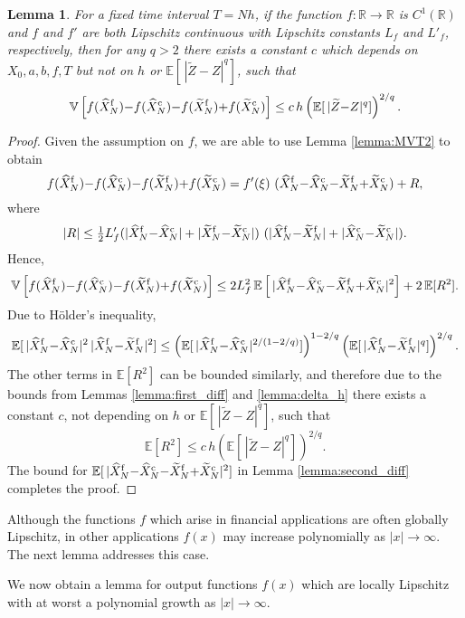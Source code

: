 \documentclass[11pt]{article}
\def \RR {{\mathbb{R}}}
\def \EE {{\mathbb{E}}}
\def \VV {{\mathbb{V}}}
\def \tZ {{\widetilde{Z}}}
\def \tXf  {{\widetilde{X}^{\rm f}}}
\def \tXc  {{\widetilde{X}^{\rm c}}}
\def \hXf {{\widehat{X}^{\rm f}}}
\def \hXc {{\widehat{X}^{\rm c}}}
\newcommand{\fracs}[2]{{\textstyle \frac{#1}{#2}}}
\newtheorem{lemma}[theorem]{Lemma}
\begin{document}
\begin{lemma}
For a fixed time interval $T\!=\!N h$, if the function $f: \RR \rightarrow \RR$
is $C^1(\RR)$ and $f$ and $f'$ are both Lipschitz continuous with Lipschitz constants 
$L_f$ and $L'_f$, respectively, then for any $q\!>\!2$ there exists a constant $c$ which 
depends on $X_0, a, b, f, T$ but not on $h$ or $\EE[\, |\tZ{-}Z|^q]$, such that
\[
\VV\left[ f(\hXf_N){-}f(\hXc_N) {-} f(\tXf_N){+}f(\tXc_N)\right] 
\leq c\, h \left(\EE[\, |\tZ{-}Z|^q]\right)^{2/q}.
\]
\end{lemma}
\begin{proof}
Given the assumption on $f$, we are able to use Lemma \ref{lemma:MVT2} to obtain
\[
f(\hXf_N){-}f(\hXc_N) {-} f(\tXf_N){+}f(\tXc_N)
= f'(\xi)\ (\hXf_N{-}\hXc_N{-}\tXf_N{+}\tXc_N)
+ R,
\]
where
\[
|R| \leq \fracs{1}{2} L'_f (|\hXf_N{-}\hXc_N| + |\tXf_N{-}\tXc_N|)\ (|\hXf_N{-}\tXf_N| + |\hXc_N{-}\tXc_N|).
\]
Hence,
\[
\VV\left[ f(\hXf_N){-}f(\hXc_N) {-} f(\tXf_N){+}f(\tXc_N)\right] 
\leq 2 L_f^2\, \EE\left[\, |\hXf_N{-}\hXc_N{-}\tXf_N{+}\tXc_N|^2\right]
 + 2\, \EE[R^2]. 
\]
Due to H\"older's inequality, 
\[
\EE[\, |\hXf_N{-}\hXc_N|^2 \, |\hXf_N{-}\tXf_N|^2]
\leq
\left( \EE[\,|\hXf_N{-}\hXc_N|^{2/(1-2/q)}] \right)^{1 - 2/q}
\left( \EE[\,|\hXf_N{-}\tXf_N|^q] \right)^{2/q}.
\]
The other terms in $\EE[R^2]$ can be bounded similarly, and therefore due to the bounds
from Lemmas \ref{lemma:first_diff} and \ref{lemma:delta_h} there exists a constant $c$,
not depending on $h$ or $\EE[\,|\tZ{-}Z|^q]$, such that
\[
\EE[R^2] \leq c\, h \left(\EE[\,|\tZ{-}Z|^q]\right)^{2/q}.
\]
The bound for $\EE[\, |\hXf_N{-}\hXc_N{-}\tXf_N{+}\tXc_N|^2]$ in Lemma
\ref{lemma:second_diff} completes the proof.
\end{proof}

Although the functions $f$ which arise in financial applications are often 
globally Lipschitz, in other applications $f(x)$ may increase polynomially
as $|x|\rightarrow \infty$.  The next lemma addresses this case.
\fi

We now obtain a lemma for output functions $f(x)$ which are locally
Lipschitz with at worst a polynomial growth as $|x|\rightarrow\infty$.
\end{document}
